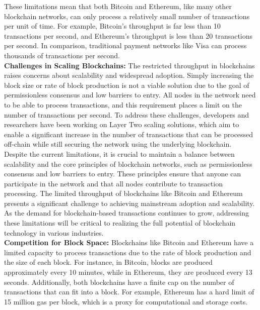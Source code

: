 These limitations mean that both Bitcoin and Ethereum, like many other blockchain networks, can only process a relatively small number of transactions per unit of time. For example, Bitcoin's throughput is far less than 10 transactions per second, and Ethereum's throughput is less than 20 transactions per second. In comparison, traditional payment networks like Visa can process thousands of transactions per second.\\

\noindent
\textbf{Challenges in Scaling Blockchains: }The restricted throughput in blockchains raises concerns about scalability and widespread adoption. Simply increasing the block size or rate of block production is not a viable solution due to the goal of permissionless consensus and low barriers to entry. All nodes in the network need to be able to process transactions, and this requirement places a limit on the number of transactions per second. To address these challenges, developers and researchers have been working on Layer Two scaling solutions, which aim to enable a significant increase in the number of transactions that can be processed off-chain while still securing the network using the underlying blockchain.\\

Despite the current limitations, it is crucial to maintain a balance between scalability and the core principles of blockchain networks, such as permissionless consensus and low barriers to entry. These principles ensure that anyone can participate in the network and that all nodes contribute to transaction processing. The limited throughput of blockchains like Bitcoin and Ethereum presents a significant challenge to achieving mainstream adoption and scalability. As the demand for blockchain-based transactions continues to grow, addressing these limitations will be critical to realizing the full potential of blockchain technology in various industries.\\

\noindent
\textbf{Competition for Block Space: }Blockchains like Bitcoin and Ethereum have a limited capacity to process transactions due to the rate of block production and the size of each block. For instance, in Bitcoin, blocks are produced approximately every 10 minutes, while in Ethereum, they are produced every 13 seconds. Additionally, both blockchains have a finite cap on the number of transactions that can fit into a block. For example, Ethereum has a hard limit of 15 million gas per block, which is a proxy for computational and storage costs.\\


